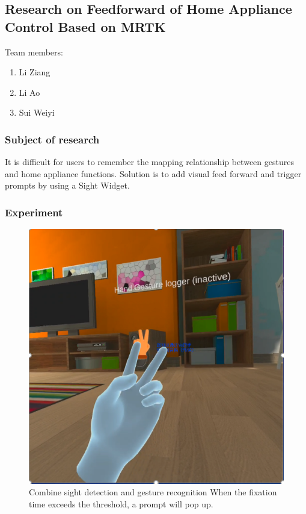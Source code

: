 \subsection{Research on Feedforward of Home Appliance Control Based on MRTK}

Team members:
\begin{enumerate}
    \item Li Ziang
    \item Li Ao
    \item Sui Weiyi
\end{enumerate}

\subsubsection{Subject of research}

It is difficult for users to remember the mapping relationship between gestures and home appliance functions.
Solution is to add visual feed forward and trigger prompts by using a Sight Widget.

\subsubsection{Experiment}

\begin{figure}
  \centering
  \includegraphics[width=0.9\linewidth]{figures/Project_7.png}
  \caption{Combine sight detection and gesture recognition
When the fixation time exceeds the threshold, a prompt will pop up.}
  \label{fig:Project7-figure}
\end{figure}

